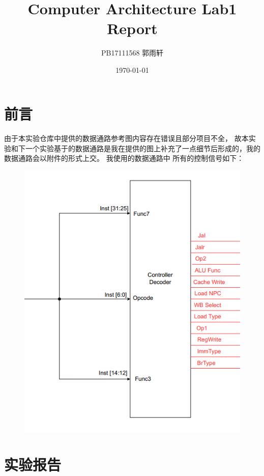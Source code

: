 \documentclass{article}
\title{Computer Architecture Lab1 Report}
\author{PB17111568 郭雨轩}
\date{\today}
\begin{document}
    \maketitle
    \section{前言}
    \paragraph{}
    由于本实验仓库中提供的数据通路参考图内容存在错误且部分项目不全，
    故本实验和下一个实验基于的数据通路是我在提供的图上补充了一点细节后形成的，我的数据通路会以附件的形式上交。
    我使用的数据通路中 所有的控制信号如下：
    \begin{figure}[htbp]
        \includegraphics[scale=0.5]{figures/1.png}
    \end{figure}
    
    \section{实验报告}
\end{document}
